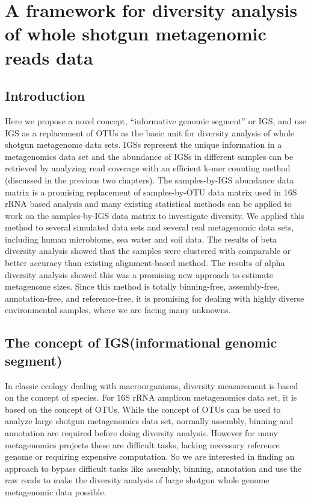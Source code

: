 \chapter{A framework for diversity analysis of whole shotgun metagenomic reads data}



\section{Introduction}



Here we propose a novel concept, ``informative genomic segment'' or IGS,
and use IGS as a replacement of OTUs as the basic unit for 
diversity analysis of whole shotgun metagenome data sets. IGSs represent the 
unique information in a metagenomics data set and the abundance of IGSs in 
different samples can be retrieved by analyzing read coverage with an efficient 
k-mer counting method (discussed in the previous two chapters).
The samples-by-IGS abundance data matrix is a promising
replacement of samples-by-OTU data matrix used in 16S rRNA based analysis and 
many existing statistical methods can be applied to work on the samples-by-IGS 
data matrix to investigate diversity. We applied this method to
several simulated data sets and several real metagenomic data sets, including
human microbiome, sea water and soil data. The results of beta diversity analysis
showed that the samples were clustered with comparable or better accuracy than 
existing alignment-based method. The results of alpha diversity analysis 
showed this was a promising new approach to estimate metagenome sizes.
Since this method is totally binning-free, 
assembly-free, annotation-free, and reference-free, it is promising 
for dealing with highly diverse environmental samples, where we are facing
many unknowns.



\section{The concept of IGS(informational genomic segment)}

In classic ecology dealing with macroorganisms, diversity measurement is based 
on the concept of species. For 16S rRNA amplicon metagenomics data set, it is 
based on the concept of OTUs. While the concept of OTUs can be used to analyze
large shotgun metagenomics data set, normally assembly, binning and annotation
are required before doing diversity analysis. However for many metagenomics 
projects these are difficult
tasks, lacking necessary reference genome or requiring expensive
computation. So we are interested in finding an approach to bypass difficult
tasks like assembly, binning, annotation and use the raw reads to make the 
diversity analysis of large shotgun whole genome metagenomic data possible. 

